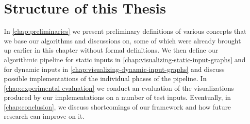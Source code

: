\section{Structure of this Thesis}
\label{sect:structure-of-this-thesis}

In \cref{chap:preliminaries} we present preliminary definitions of various concepts that we base our algorithms and discussions on, some of which were already brought up earlier in this chapter without formal definitions.
We then define our algorithmic pipeline for static inputs in \cref{chap:visualizing-static-input-graphs} and for dynamic inputs in \cref{chap:visualizing-dynamic-input-graphs} and discuss possible implementations of the individual phases of the pipeline.
In \cref{chap:experimental-evaluation} we conduct an evaluation of the visualizations produced by our implementations on a number of test inputs.
Eventually, in \cref{chap:conclusion}, we discuss shortcomings of our framework and how future research can improve on it.
